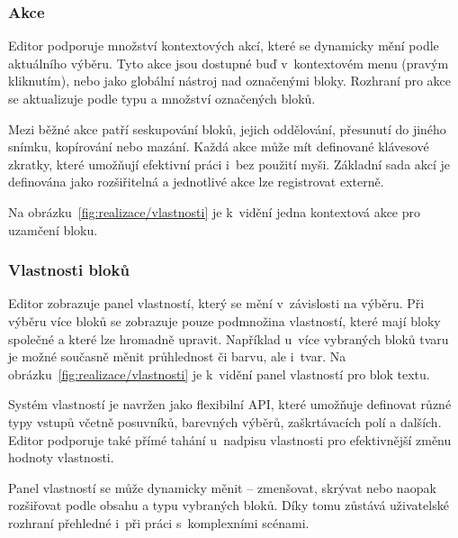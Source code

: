 \subsubsection{Akce}

Editor podporuje množství kontextových akcí, které se dynamicky mění podle aktuálního výběru. 
Tyto akce jsou dostupné buď v~kontextovém menu (pravým kliknutím), nebo jako globální nástroj nad označenými bloky. 
Rozhraní pro akce se aktualizuje podle typu a množství označených bloků.

Mezi běžné akce patří seskupování bloků, jejich oddělování, přesunutí do jiného snímku, kopírování nebo mazání. 
Každá akce může mít definované klávesové zkratky, které umožňují efektivní práci i~bez použití myši. 
Základní sada akcí je definována jako rozšiřitelná a jednotlivé akce lze registrovat externě.

Na obrázku~\ref{fig:realizace/vlastnosti} je k~vidění jedna kontextová akce pro uzamčení bloku.


\subsubsection{Vlastnosti bloků}

Editor zobrazuje panel vlastností, který se mění v~závislosti na výběru. 
Při výběru více bloků se zobrazuje pouze podmnožina vlastností, které mají bloky společné a které lze hromadně upravit. 
Například u~více vybraných bloků tvaru je možné současně měnit průhlednost či barvu, ale i~tvar.
Na obrázku~\ref{fig:realizace/vlastnosti} je k~vidění panel vlastností pro blok textu.

Systém vlastností je navržen jako flexibilní API, které umožňuje definovat různé typy vstupů včetně posuvníků, barevných výběrů, zaškrtávacích polí a dalších. 
Editor podporuje také přímé tahání u~nadpisu vlastnosti pro efektivnější změnu hodnoty vlastnosti.

Panel vlastností se může dynamicky měnit -- zmenšovat, skrývat nebo naopak rozšiřovat podle obsahu a typu vybraných bloků. 
Díky tomu zůstává uživatelské rozhraní přehledné i~při práci s~komplexními scénami.


